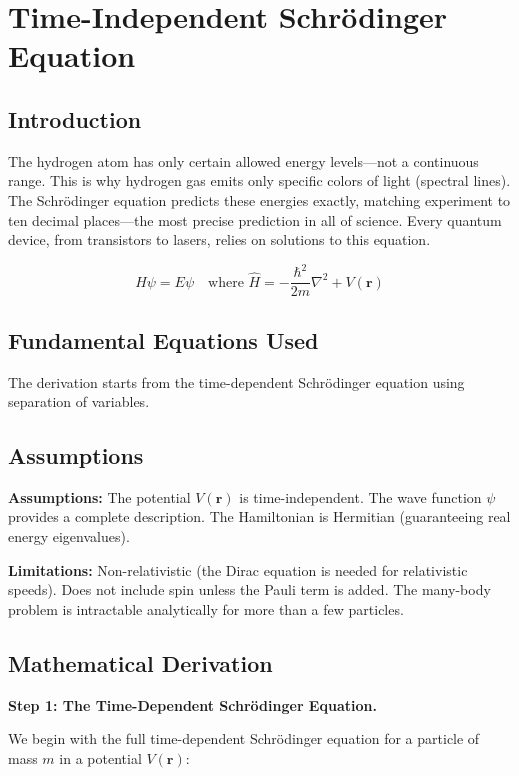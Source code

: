\chapter{Time-Independent Schr\"odinger Equation}

\section*{Introduction}

The hydrogen atom has only certain allowed energy levels---not a continuous range. This is why hydrogen gas emits only specific colors of light (spectral lines). The Schr\"odinger equation predicts these energies exactly, matching experiment to ten decimal places---the most precise prediction in all of science. Every quantum device, from transistors to lasers, relies on solutions to this equation.



\[
\hat{H}\psi = E\psi \quad \text{where } \hat{H} = -\frac{\hbar^2}{2m}\nabla^2 + V(\mathbf{r})
\]

\section*{Fundamental Equations Used}

The derivation starts from the time-dependent Schr\"odinger equation using separation of variables.

\section*{Assumptions}

\textbf{Assumptions:} The potential $V(\mathbf{r})$ is time-independent. The wave function $\psi$ provides a complete description. The Hamiltonian is Hermitian (guaranteeing real energy eigenvalues).


\textbf{Limitations:} Non-relativistic (the Dirac equation is needed for relativistic speeds). Does not include spin unless the Pauli term is added. The many-body problem is intractable analytically for more than a few particles.


\section*{Mathematical Derivation}

\textbf{Step 1: The Time-Dependent Schr\"odinger Equation.}

We begin with the full time-dependent Schr\"odinger equation for a particle of mass $m$ in a potential $V(\mathbf{r})$:


